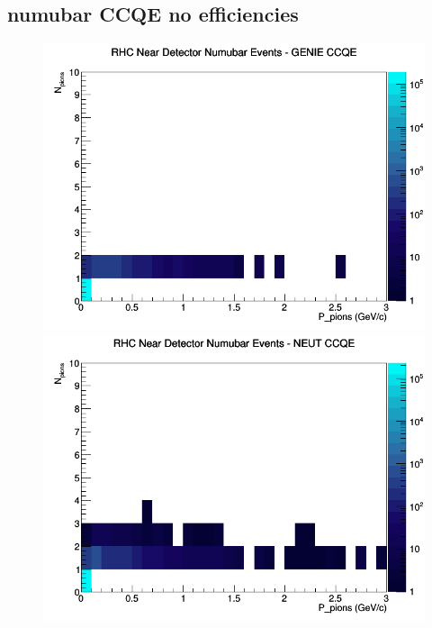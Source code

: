 \documentclass[12pt]{article}
\begin{document}
\subsection{numubar CCQE no efficiencies}
\begin{figure}[h]
\includegraphics[width=\linewidth]{N_P/nominal/pions/CCQE_RHC_ND_numubar_N_P_GENIE.png}
\endminipage
{}
\includegraphics[width=\linewidth]{N_P/nominal/pions/CCQE_RHC_ND_numubar_N_P_NEUT.png}
\endminipage
{}

\end{figure}
\end{document}
